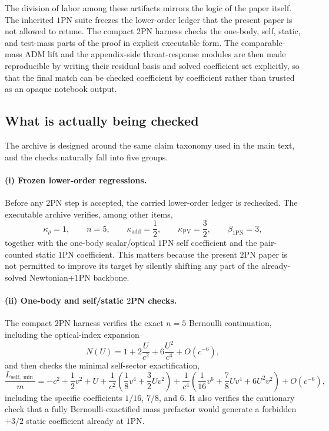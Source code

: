 \documentclass[11pt]{article}
\newcommand{\OnePN}{\mathrm{1PN}}
\newcommand{\TwoPN}{\mathrm{2PN}}
\newcommand{\ADM}{\mathrm{ADM}}
\newcommand{\kadd}{\kappa_{\mathrm{add}}}
\newcommand{\kPV}{\kappa_{\mathrm{PV}}}
\newcommand{\krho}{\kappa_{\rho}}
\begin{document}
The division of labor among these artifacts mirrors the logic of the paper itself.
The inherited \(\OnePN\) suite freezes the lower-order ledger that the present paper is
not allowed to retune.
The compact \(\TwoPN\) harness checks the one-body, self, static, and test-mass parts of
the proof in explicit executable form.
The comparable-mass \(\ADM\) lift and the appendix-side throat-response modules are then
made reproducible by writing their residual basis and solved coefficient set explicitly,
so that the final match can be checked coefficient by coefficient rather than trusted as
an opaque notebook output.

\subsection{What is actually being checked}
\label{sec:verification-checked}

The archive is designed around the same claim taxonomy used in the main text, and the
checks naturally fall into five groups.

\paragraph{(i) Frozen lower-order regressions.}
Before any \(\TwoPN\) step is accepted, the carried lower-order ledger is rechecked.
The executable archive verifies, among other items,
\begin{equation}
\krho=1,
\qquad
n=5,
\qquad
\kadd=\frac12,
\qquad
\kPV=\frac32,
\qquad
\beta_{\OnePN}=3,
\label{eq:verification-frozen-ledger}
\end{equation}
together with the one-body scalar/optical \(\OnePN\) self coefficient and the pair-counted
static \(\OnePN\) coefficient.  This matters because the present \(\TwoPN\) paper is not
permitted to improve its target by silently shifting any part of the already-solved
Newtonian+\(\OnePN\) backbone.

\paragraph{(ii) One-body and self/static \texorpdfstring{$2$}{2}PN checks.}
The compact \(\TwoPN\) harness verifies the exact \(n=5\) Bernoulli continuation,
including the optical-index expansion
\begin{equation}
N(U)=1+2\frac{U}{c^2}+6\frac{U^2}{c^4}+O(c^{-6}),
\label{eq:verification-bernoulli-index}
\end{equation}
and then checks the minimal self-sector exactification,
\begin{equation}
\frac{L_{\mathrm{self},\min}}{m}
=-c^2+\frac12 v^2+U
+\frac{1}{c^2}\left(\frac18 v^4+\frac32 Uv^2\right)
+\frac{1}{c^4}\left(\frac1{16}v^6+\frac78 Uv^4+6U^2v^2\right)+O(c^{-6}),
\label{eq:verification-self-minimal}
\end{equation}
including the specific coefficients \(1/16\), \(7/8\), and \(6\).
It also verifies the cautionary check that a fully Bernoulli-exactified mass prefactor
would generate a forbidden \(+3/2\) static coefficient already at \(\OnePN\).
\end{document}
